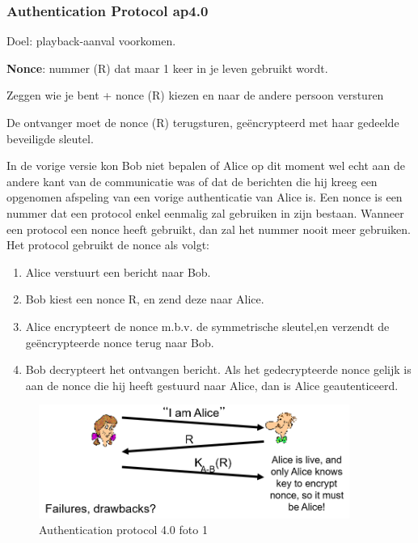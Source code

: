 \subsubsection{Authentication Protocol ap4.0}

Doel: playback-aanval voorkomen.

\noindent \textbf{Nonce}: nummer (R) dat maar 1 keer in je leven gebruikt wordt.


\fra  Zeggen wie je bent + nonce (R) kiezen en naar de andere persoon versturen

\fra  De ontvanger moet de nonce (R) terugsturen, geëncrypteerd met haar gedeelde beveiligde sleutel.

\noindent In de vorige versie kon Bob niet bepalen of Alice op dit moment wel echt aan de andere kant van de communicatie was of dat de berichten die hij kreeg een opgenomen afspeling van een vorige authenticatie van Alice is. Een nonce is een nummer dat een protocol enkel eenmalig zal gebruiken in zijn bestaan. Wanneer een protocol een nonce heeft gebruikt, dan zal het nummer nooit meer gebruiken. Het protocol gebruikt de nonce als volgt:
\begin{enumerate}
    \item Alice verstuurt een bericht naar Bob.
\item Bob kiest een nonce R, en zend deze naar Alice.
\item Alice encrypteert de nonce m.b.v. de symmetrische sleutel,en verzendt de geëncrypteerde nonce terug naar Bob.
\item Bob decrypteert het ontvangen bericht. Als het gedecrypteerde nonce gelijk is aan de nonce die hij heeft gestuurd naar Alice, dan is Alice geautenticeerd.

\end{enumerate}

\begin{figure}[h]
    \centering
    \includegraphics[width=4in]{./img/imghfdst8/hfdst8puntje20.png}
    \caption{Authentication protocol 4.0 foto 1 }      
    \label{fig:Authentication protocol 4.0 foto 1 }
\end{figure}

